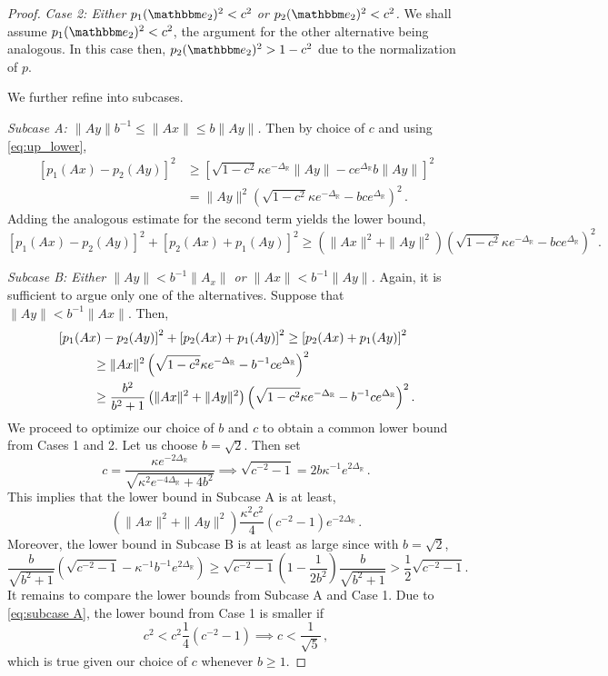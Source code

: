 \documentclass{amsart}
\numberwithin{equation}{section}
\newcommand\bR{{\mathbb R}}
\newcommand{\bbe}{\mathbbm e}
\begin{document}
\begin{proof}
\medskip
\noindent
{\em Case 2: Either $p_1(\bbe_2)^2 < c^2$ or $p_2(\bbe_2)^2 < c^2$.}
We shall assume $p_1(\bbe_2)^2 <c^2$, the argument for the other alternative being analogous.
In this case then, $p_2(\bbe_2)^2 > 1-c^2$ due to the normalization of $p$.

We further refine into subcases.

{\em Subcase A: $\| Ay \| b^{-1} \le \| Ax \| \le b \|Ay \|$.}
Then by choice of $c$ and using \eqref{eq:up_lower},
\[
\begin{split}
 \left[p_1(Ax)-p_2(Ay)\right]^2 &\ge \left[ \sqrt{1-c^2} \kappa e^{-\Delta_\bR} \| Ay \| - c e^{\Delta_\bR} b \| Ay \| \right]^2 \\
 &= \| Ay \|^2 \left( \sqrt{1-c^2} \kappa e^{-\Delta_\bR} - b c e^{\Delta_\bR} \right)^2 \, .
  \end{split}
\]
Adding the analogous estimate for the second term yields the lower bound,
\[
 \left[p_1(Ax)-p_2(Ay)\right]^2 + \left[p_2(Ax)+p_1(Ay)\right]^2 \ge  \left( \| Ax \|^2 + \|A y \|^2 \right) \left( \sqrt{1-c^2} \kappa e^{-\Delta_\bR} - b c e^{\Delta_\bR} \right)^2 \, .
\]

{\em Subcase B: Either $\| Ay \| < b^{-1} \| A_x \|$ or $\| Ax \| < b^{-1} \| Ay \|$.}
Again, it is sufficient to argue only one of the alternatives.  Suppose that $\| Ay \| < b^{-1} \| Ax \|$.
Then,
\[
\begin{split}
 &\left[p_1(Ax)-p_2(Ay)\right]^2 + \left[p_2(Ax)+p_1(Ay)\right]^2 \ge
\left[p_2(Ax) + p_1(Ay)\right]^2 \\
&\hskip1cm\ge \| A x \|^2 \left( \sqrt{1-c^2} \kappa e^{-\Delta_\bR} - b^{-1} c e^{\Delta_\bR} \right)^2\\
&\hskip1cm\ge \frac{b^2}{b^2+1} \left( \| Ax \|^2 + \| Ay \|^2 \right) \left( \sqrt{1-c^2} \kappa e^{-\Delta_\bR} - b^{-1} c e^{\Delta_\bR} \right)^2 .
\end{split}
\]
We proceed to optimize our choice of $b$ and $c$ to obtain a common lower bound from Cases
1 and 2.  Let us choose $b=\sqrt{2}$.  Then set 
\[
c = \frac{\kappa e^{- 2\Delta_{\bR}}}{\sqrt{\kappa^2 e^{-4\Delta_\bR} + 4b^2}} \implies
\sqrt{c^{-2} - 1} = 2 b \kappa^{-1} e^{2 \Delta_{\bR}} \, .
\]
This implies that the lower bound in Subcase A is at least,
\begin{equation}
\label{eq:subcase A}
\left( \| Ax \|^2 + \| Ay \|^2 \right) \frac{ \kappa^2 c^2}{4} \left( c^{-2} -1 \right) e^{-2 \Delta_\bR} \, .
\end{equation}
Moreover, the lower bound in Subcase B is at least as large since with $b=\sqrt{2}$,
\[
\frac{b}{\sqrt{b^2+1}} \left(\sqrt{c^{-2} - 1} - \kappa^{-1} b^{-1} e^{2 \Delta_\bR} \right)
\ge \sqrt{c^{-2}-1} \left( 1 - \frac{1}{2b^2} \right) \frac{b}{\sqrt{b^2+1}} > \frac 12 \sqrt{c^{-2} -1} .
\]
It remains to compare the lower bounds from Subcase A and Case 1.  Due to \eqref{eq:subcase A},
the lower bound from Case 1 is smaller if
\[
c^2  < c^2 \frac{1}{4} (c^{-2} -1) \implies c < \frac{1}{\sqrt{5}} \, ,
\]
which is true given our choice of $c$ whenever $b \ge 1$.


\end{proof}
\end{document}
